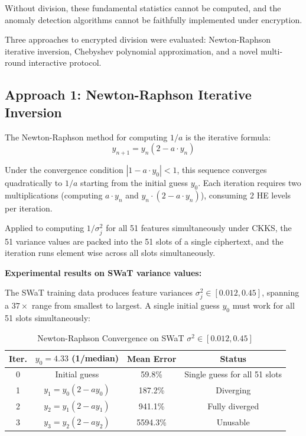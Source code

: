 Without division, these fundamental statistics cannot be computed, and the
anomaly detection algorithms cannot be faithfully implemented under encryption.

Three approaches to encrypted division were evaluated: Newton-Raphson iterative
inversion, Chebyshev polynomial approximation, and a novel multi-round
interactive protocol.

\subsection{Approach 1: Newton-Raphson Iterative Inversion}

The Newton-Raphson method for computing $1/a$ is the iterative formula:
\begin{equation}
  y_{n+1} = y_n(2 - a \cdot y_n)
  \label{eq:nr}
\end{equation}

Under the convergence condition $|1 - a \cdot y_0| < 1$, this sequence
converges quadratically to $1/a$ starting from the initial guess $y_0$. Each
iteration requires two multiplications (computing $a \cdot y_n$ and
$y_n \cdot (2 - a \cdot y_n)$), consuming 2 HE levels per iteration.

Applied to computing $1/\sigma_j^2$ for all 51 features simultaneously under
CKKS, the 51 variance values are packed into the 51 slots of a single
ciphertext, and the iteration runs element wise across all slots simultaneously.

\textbf{Experimental results on SWaT variance values:}

The SWaT training data produces feature variances $\sigma_j^2 \in [0.012,
0.45]$, spanning a $37\times$ range from smallest to largest. A single initial
guess $y_0$ must work for all 51 slots simultaneously:

\begin{table}[H]
\centering
\caption{Newton-Raphson Convergence on SWaT $\sigma^2 \in [0.012, 0.45]$}
\label{tab:nr}
\begin{tabular}{cccc}
\toprule
\textbf{Iter.} & \textbf{$y_0 = 4.33$ (1/median)} & \textbf{Mean Error} & \textbf{Status} \\
\midrule
0 & Initial guess & 59.8\% & Single guess for all 51 slots \\
1 & $y_1 = y_0(2-ay_0)$ & 187.2\% & Diverging \\
2 & $y_2 = y_1(2-ay_1)$ & 941.1\% & Fully diverged \\
3 & $y_3 = y_2(2-ay_2)$ & 5594.3\% & Unusable \\
\bottomrule
\end{tabular}
\end{table}


